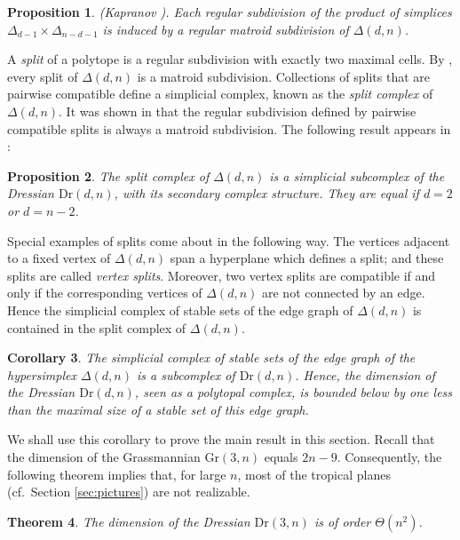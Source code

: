 \documentclass[12pt,a4paper]{amsart}
\newtheorem{thm}{Theorem}[section]
\newtheorem{cor}[thm]{Corollary}
\newtheorem{prop}[thm]{Proposition}
\theoremstyle{definition}
\newcommand{\Gr}{{\mathrm{Gr}}}
\newcommand{\Dr}{{\mathrm{Dr}}}
\begin{document}
\begin{prop}{\rm (Kapranov \cite[Corollary~1.4.14]{K})}\label{prop:K}.
  Each regular subdivision of 
the product of simplices $\Delta_{d-1}\times\Delta_{n-d-1}$ is
  induced by a regular matroid subdivision of $\Delta(d,n)$.
\end{prop}

A \emph{split} of a polytope is a regular subdivision with exactly two
maximal cells.  By \cite[Lemma~7.4]{HJ}, every split of $\Delta(d,n)$ is a matroid subdivision.
Collections of splits that are pairwise compatible define a
simplicial complex, known as the \emph{split complex} of $\Delta(d,n)$.
It was shown in \cite[Section~7]{HJ} that the regular subdivision defined
by pairwise compatible splits is always a matroid subdivision. The
following result appears in \cite[Theorem~7.8]{HJ}:

\begin{prop}
  \label{prop:HJ}
  The split complex of $\Delta(d,n)$ is a simplicial subcomplex
  of the Dressian $\Dr(d,n)$, with its secondary complex structure.
They are equal if $d=2$ or $d=n-2$.
\end{prop}

Special examples of splits come about in the following way.  The
vertices adjacent to a fixed vertex of $\Delta(d,n)$ span a hyperplane
which defines a split; and these splits are called \emph{vertex
  splits}.  Moreover, two vertex splits are compatible if and only if
the corresponding vertices of $\Delta(d,n)$ are not connected by an
edge. Hence the simplicial complex of stable sets of the edge graph of
$\Delta(d,n)$ is contained in the split complex of $\Delta(d,n)$.

\begin{cor}
  \label{cor:dimlowbd}
  The simplicial complex of stable sets of the edge graph of the
  hypersimplex $\Delta(d,n)$ is a subcomplex of $\Dr(d,n)$.  Hence,
  the dimension of the Dressian $\Dr(d,n)$, seen as a polytopal
  complex, is bounded below by one less than the maximal size of a
  stable set of this edge graph.
\end{cor}

We shall use this corollary to prove the main result in this section.
Recall that the dimension of the Grassmannian $\Gr(3,n)$ equals
$2n-9$.  Consequently, the following theorem implies that, for large
$n$, most of the tropical planes (cf.~Section \ref{sec:pictures}) are
not realizable.

\begin{thm}\label{thm:dim_bound}
  The dimension of  the Dressian $\Dr(3,n)$ is of order $\Theta(n^2)$.
\end{thm}
\end{document}
